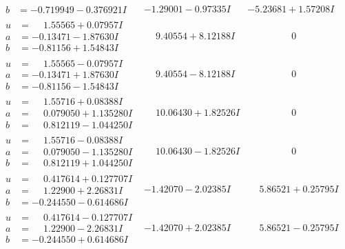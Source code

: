 \documentclass[1p]{elsarticle_modified}
\theoremstyle{definition}
\begin{document}
$$\begin{array}{c|c|c}
\begin{aligned}
b &= -0.719949 - 0.376921 I\end{aligned}
 & -1.29001 - 0.97335 I & -5.23681 + 1.57208 I \\ \hline\begin{aligned}
u &= \phantom{-}1.55565 + 0.07957 I \\
a &= -0.13471 - 1.87630 I \\
b &= -0.81156 + 1.54843 I\end{aligned}
 & \phantom{-}9.40554 + 8.12188 I & \phantom{-0.000000 } 0 \\ \hline\begin{aligned}
u &= \phantom{-}1.55565 - 0.07957 I \\
a &= -0.13471 + 1.87630 I \\
b &= -0.81156 - 1.54843 I\end{aligned}
 & \phantom{-}9.40554 - 8.12188 I & \phantom{-0.000000 } 0 \\ \hline\begin{aligned}
u &= \phantom{-}1.55716 + 0.08388 I \\
a &= \phantom{-}0.079050 + 1.135280 I \\
b &= \phantom{-}0.812119 - 1.044250 I\end{aligned}
 & \phantom{-}10.06430 + 1.82526 I & \phantom{-0.000000 } 0 \\ \hline\begin{aligned}
u &= \phantom{-}1.55716 - 0.08388 I \\
a &= \phantom{-}0.079050 - 1.135280 I \\
b &= \phantom{-}0.812119 + 1.044250 I\end{aligned}
 & \phantom{-}10.06430 - 1.82526 I & \phantom{-0.000000 } 0 \\ \hline\begin{aligned}
u &= \phantom{-}0.417614 + 0.127707 I \\
a &= \phantom{-}1.22900 + 2.26831 I \\
b &= -0.244550 - 0.614686 I\end{aligned}
 & -1.42070 - 2.02385 I & \phantom{-}5.86521 + 0.25795 I \\ \hline\begin{aligned}
u &= \phantom{-}0.417614 - 0.127707 I \\
a &= \phantom{-}1.22900 - 2.26831 I \\
b &= -0.244550 + 0.614686 I\end{aligned}
 & -1.42070 + 2.02385 I & \phantom{-}5.86521 - 0.25795 I \\ \hline\begin{aligned}

\end{aligned}
\end{array}$$
\end{document}
